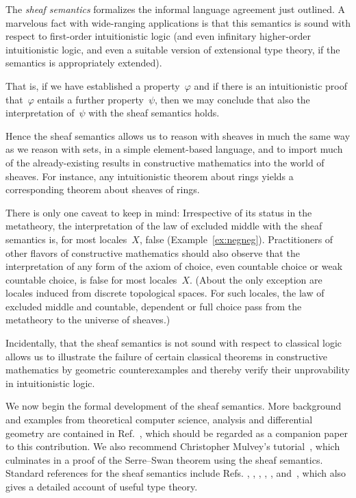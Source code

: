 \documentclass{ws-rv9x6}
\begin{document}
{The \emph{sheaf semantics} formalizes the informal language agreement just
outlined. A marvelous fact with wide-ranging applications is that this
semantics is sound with respect to first-order intuitionistic logic (and even
infinitary higher-order intuitionistic logic, and even a suitable version of
extensional type theory, if the semantics is appropriately extended).

That is, if we have established a property~$\varphi$ and if there is an
intuitionistic proof that~$\varphi$ entails a further property~$\psi$, then we
may conclude that also the interpretation of~$\psi$ with the sheaf semantics
holds.

Hence the sheaf semantics allows us to reason with sheaves in much the same way
as we reason with sets, in a simple element-based language, and to import much
of the already-existing results in constructive mathematics into the world of
sheaves. For instance, any intuitionistic theorem about rings yields a
corresponding theorem about sheaves of rings.

There is only one caveat to keep in mind: Irrespective of its status in the
metatheory, the interpretation of the law of excluded middle with the sheaf
semantics is, for most locales~$X$, false (Example~\ref{ex:negneg}).
Practitioners of other flavors of constructive mathematics should also observe
that the interpretation of any form of the axiom of choice, even countable
choice or weak countable choice, is false for most locales~$X$. (About the only
exception are locales induced from discrete topological spaces. For such
locales, the law of excluded middle and countable, dependent or full choice
pass from the metatheory to the universe of sheaves.)

Incidentally, that the sheaf semantics is not sound with respect to classical
logic allows us to illustrate the failure of certain classical theorems in
constructive mathematics by geometric counterexamples and thereby verify their
unprovability in intuitionistic logic.

We now begin the formal development of the sheaf semantics. More background and
examples from theoretical computer science, analysis and differential geometry
are contained in Ref.~, which should be
regarded as a companion paper to this contribution. We also recommend
Christopher Mulvey's tutorial~\cite{mulvey:repr}, which culminates in a proof
of the Serre--Swan theorem using the sheaf semantics. Standard references for
the sheaf semantics include Refs.
\cite[Chapter~VI]{moerdijk-maclane:sheaves-logic},
\cite[Chapter~14]{goldblatt:topoi},
\cite[Section~5]{caramello:preliminaries},
\cite[Sections~12--15]{streicher:ctcl},
\cite[Chapter~6]{borceux:handbook3},
\cite[Part~D]{johnstone:elephant} and~,
which also gives a detailed account of useful type theory.

}
\end{document}

